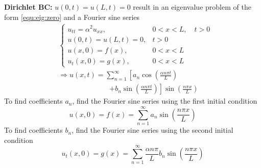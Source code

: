 \documentclass[10pt,leqno]{article}
\begin{document}
\begin{multicols}{2}
    
\textbf{Dirichlet BC:} $u(0,t) = u(L,t)= 0$ result in an eigenvalue pro\-blem of the form \eqref{equ:eig:zero} and a Fourier sine series
\begin{align}
    & \left\{ \begin{array}{ll}
            u_{tt} = \alpha^{2} u_{xx}, & 0<x<L, \quad t>0 \\
            u(0,t) = u(L,t)= 0, & t>0 \\
            u(x,0) = f(x), & 0<x<L \\
            u_{t}(x,0) = g(x), & 0<x<L
    \end{array}\right. \label{equ:wave:dirichlet} \\
    & \Rightarrow u(x,t)= \sum_{n=1}^{\infty}\left[ a_{n}\cos\left( \frac{\alpha n\pi t}{L} \right) \right. \\
    & \hspace{3cm} \left. + b_{n}\sin\left( \frac{\alpha n\pi t}{L} \right) \right] \sin\left(\frac{n\pi x}{L}\right) \nonumber
\end{align}
To find coefficients $a_{n}$, find the Fourier sine series using the first initial condition
\begin{equation}
    u(x,0)=f(x)=\sum_{n=1}^{\infty} a_{n} \sin \left(\frac{n\pi x}{L}\right)
\end{equation}
To find coefficients $b_{n}$, find the Fourier sine series using the second initial condition
\begin{equation}
    u_{t}(x,0)=g(x)=\sum_{n=1}^{\infty} \frac{\alpha n\pi}{L} b_{n} \sin \left(\frac{n\pi x}{L}\right)
\end{equation}



\end{multicols}
\end{document}
